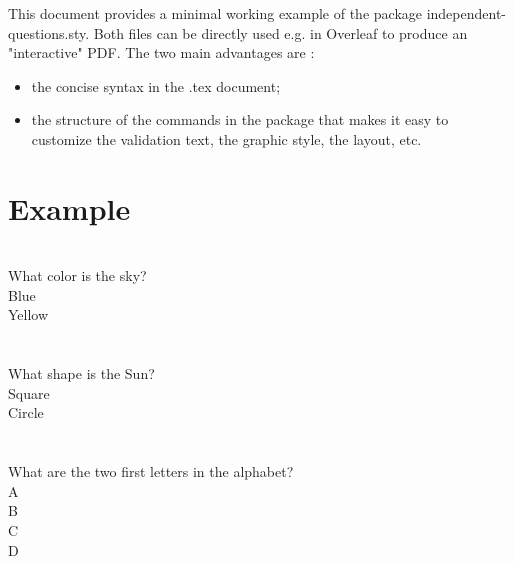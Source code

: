 \documentclass{article}
\begin{document}
This document provides a minimal working example of the package independent-questions.sty.
Both files can be directly used e.g. in Overleaf to produce an "interactive" PDF.
The two main advantages are :
\begin{itemize}
\item the concise syntax in the .tex document;
\item the structure of the commands in the package that makes it easy to customize the validation text, the graphic style, the layout, etc.
\end{itemize}

\section{Example}

\SingleAnswerMode \\
What color is the sky? \\
\newChoice Blue \\
\newChoice Yellow \\
 \\

\SingleAnswerMode \\
What shape is the Sun? \\
\newChoice Square \\
\newChoice Circle \\
 \\

\MultipleAnswersMode \\
What are the two first letters in the alphabet? \\
\newChoice A \\
\newChoice B \\
\newChoice C \\
\newChoice D \\
 \\
\end{document}
